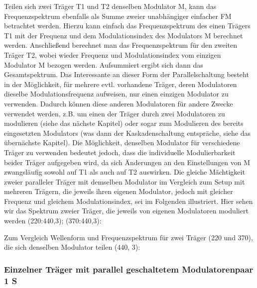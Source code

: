 Teilen sich zwei Träger T1 und T2 denselben Modulator M, kann das Frequenzspektrum ebenfalls als Summe zweier unabhängiger einfacher FM betrachtet werden. Hierzu kann einfach das Frequenzspektrum des einen Trägers T1 mit der Frequenz und dem Modulationsindex des Modulators M berechnet werden. Anschließend berechnet man das Frequenzspektrum für den zweiten Träger T2, wobei wieder Frequenz und Modulationsindex vom einzigen Modulator M bezogen werden. Aufsummiert ergibt sich dann das Gesamtspektrum. Das Interessante an dieser Form der Parallelschaltung  besteht in der Möglichkeit, für mehrere evtl. vorhandene Träger, deren Modulatoren dieselbe Modulationsfrequenz aufweisen, nur einen einzigen Modulator zu verwenden. Dadurch können diese anderen Modulatoren für andere Zwecke verwendet werden, z.B. um einen der Träger durch zwei Modulatoren zu modulieren (siehe das nächste Kapitel) oder sogar zum Modulieren des bereits eingesetzten Modulators (was dann der Kaskadenschaltung entspräche, siehe das übernächste Kapitel). Die Möglichkeit, denselben Modulator für verschiedene Träger zu verwenden bedeutet jedoch, dass die individuelle Modulierbarkeit beider Träger aufgegeben wird, da sich Änderungen an den Einstellungen von M zwangsläufig sowohl auf T1 als auch auf T2 auswirken. Die gleiche Mächtigkeit zweier paralleler Träger mit demselben Modulator im Vergleich zum Setup mit mehreren Trägern, die jeweils ihren eigenen Modulator, jedoch mit gleicher Frequenz und gleichem Modulationsindex, sei im Folgenden illustriert. Hier sehen wir das Spektrum zweier Träger, die jeweils von eigenen Modulatoren moduliert werden (220:440,3); (370:440,3):

Zum Vergleich Wellenform und Frequenzspektrum für zwei Träger (220 und 370), die sich denselben Modulator teilen (440, 3):

\subsubsection{Einzelner Träger mit parallel geschaltetem Modulatorenpaar 1 S}

